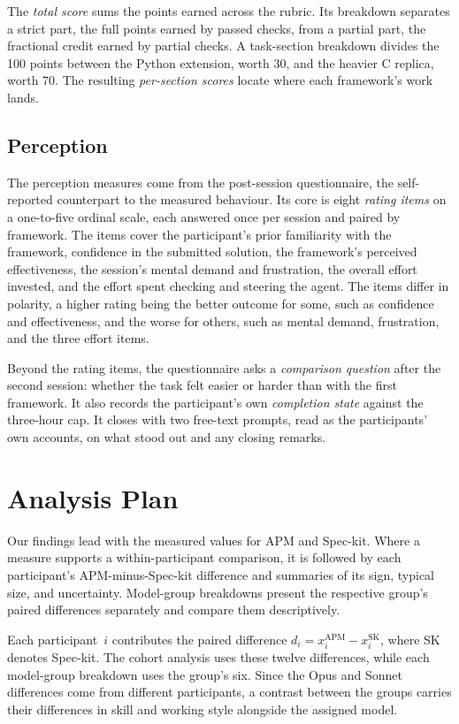 The \emph{total score} sums the points earned across the rubric. Its breakdown separates a strict part, the full points earned by passed checks, from a partial part, the fractional credit earned by partial checks. A task-section breakdown divides the 100 points between the Python extension, worth 30, and the heavier C replica, worth 70. The resulting \emph{per-section scores} locate where each framework's work lands.

\subsection{Perception}
\label{sec:evaluation-metrics-perception}

The perception measures come from the post-session questionnaire, the self-reported counterpart to the measured behaviour. Its core is eight \emph{rating items} on a one-to-five ordinal scale, each answered once per session and paired by framework. The items cover the participant's prior familiarity with the framework, confidence in the submitted solution, the framework's perceived effectiveness, the session's mental demand and frustration, the overall effort invested, and the effort spent checking and steering the agent. The items differ in polarity, a higher rating being the better outcome for some, such as confidence and effectiveness, and the worse for others, such as mental demand, frustration, and the three effort items.

Beyond the rating items, the questionnaire asks a \emph{comparison question} after the second session: whether the task felt easier or harder than with the first framework. It also records the participant's own \emph{completion state} against the three-hour cap. It closes with two free-text prompts, read as the participants' own accounts, on what stood out and any closing remarks.

\section{Analysis Plan}
\label{sec:evaluation-analysis-plan}

Our findings lead with the measured values for APM and Spec-kit. Where a measure supports a within-participant comparison, it is followed by each participant's APM-minus-Spec-kit difference and summaries of its sign, typical size, and uncertainty. Model-group breakdowns present the respective group's paired differences separately and compare them descriptively.

Each participant~$i$ contributes the paired difference $d_i = x_i^{\text{APM}} - x_i^{\text{SK}}$, where SK denotes Spec-kit. The cohort analysis uses these twelve differences, while each model-group breakdown uses the group's six. Since the Opus and Sonnet differences come from different participants, a contrast between the groups carries their differences in skill and working style alongside the assigned model.

